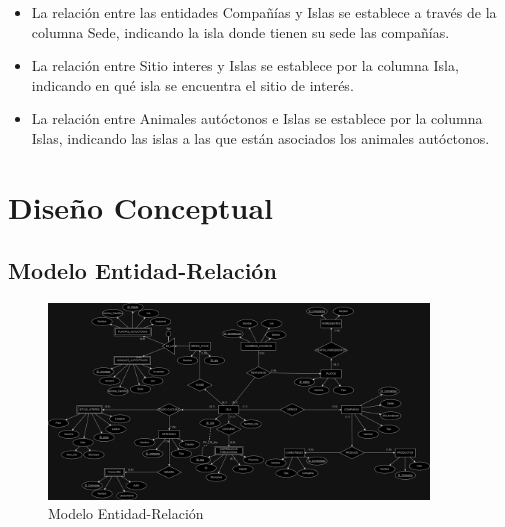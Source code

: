 \documentclass[11pt]{report}
\begin{document}
\begin{itemize}
    \item La relación entre las entidades Compañías y Islas se establece a través de la columna Sede, indicando la isla donde tienen su sede las compañías.
    \item La relación entre Sitio interes y Islas se establece por la columna Isla, indicando en qué isla se encuentra el sitio de interés.
    \item La relación entre Animales autóctonos e Islas se establece por la columna Islas, indicando las islas a las que están asociados los animales autóctonos.
\end{itemize}
\section{Diseño Conceptual}

\subsection{Modelo Entidad-Relación}
\begin{figure}[H]
    \centering
    \includegraphics[width=0.9\textwidth]{../diagrams/ER-PF-ADBD.jpg}
    \caption{Modelo Entidad-Relación}
    \label{fig:modelo_er}
\end{figure}
\end{document}
